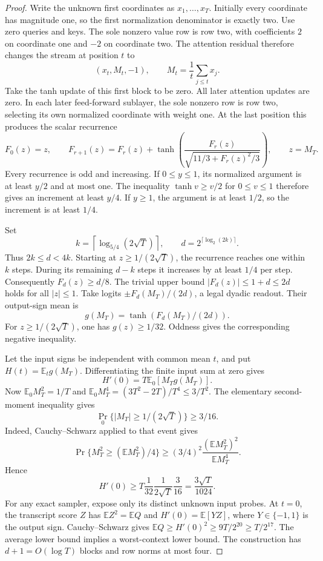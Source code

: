 \begin{proof}
Write the unknown first coordinates as $x_1,\ldots,x_T$. Initially every
coordinate has magnitude one, so the first normalization denominator is
exactly two. Use zero queries and keys. The sole nonzero value row is
row two, with coefficients $2$ on coordinate one and $-2$ on coordinate
two. The attention residual therefore changes the stream at position
$t$ to
\[
 (x_t,M_t,-1),\qquad M_t=\frac1t\sum_{j\le t}x_j.
\]
Take the tanh update of this first block to be zero. All later attention
updates are zero. In each later feed-forward sublayer, the sole nonzero
row is row two, selecting its own normalized coordinate with weight one.
At the last position this produces the scalar recurrence
\[
 F_0(z)=z,\qquad
 F_{r+1}(z)=F_r(z)+
   \tanh\!\left(\frac{F_r(z)}
      {\sqrt{11/3+F_r(z)^2/3}}\right),
 \qquad z=M_T.
\]
Every recurrence is odd and increasing. If $0\le y\le1$, its normalized
argument is at least $y/2$ and at most one. The inequality
$\tanh v\ge v/2$ for $0\le v\le1$ therefore gives an increment at least
$y/4$. If $y\ge1$, the argument is at least $1/2$, so the increment is
at least $1/4$.

Set
\[
 k=\left\lceil\log_{5/4}(2\sqrt T)\right\rceil,
 \qquad d=2^{\lceil\log_2(2k)\rceil}.
\]
Thus $2k\le d<4k$. Starting at $z\ge1/(2\sqrt T)$, the recurrence
reaches one within $k$ steps. During its remaining $d-k$ steps it
increases by at least $1/4$ per step. Consequently
$F_d(z)\ge d/8$. The trivial upper bound $|F_d(z)|\le1+d\le2d$ holds
for all $|z|\le1$. Take logits $\pm F_d(M_T)/(2d)$, a legal dyadic
readout. Their output-sign mean is
\[
 g(M_T)=\tanh(F_d(M_T)/(2d)).
\]
For $z\ge1/(2\sqrt T)$, one has $g(z)\ge1/32$. Oddness gives the
corresponding negative inequality.

Let the input signs be independent with common mean $t$, and put
$H(t)=\mathbb E_tg(M_T)$. Differentiating the finite input sum at zero
gives
\[
 H'(0)=T\mathbb E_0[M_Tg(M_T)].
\]
Now $\mathbb E_0M_T^2=1/T$ and
$\mathbb E_0M_T^4=(3T^2-2T)/T^4\le3/T^2$. The elementary
second-moment inequality gives
\[
 \Pr_0\{|M_T|\ge1/(2\sqrt T)\}\ge3/16.
\]
Indeed, Cauchy--Schwarz applied to that event gives
\[
 \Pr\{M_T^2\ge(\mathbb E M_T^2)/4\}
 \ge(3/4)^2\frac{(\mathbb E M_T^2)^2}{\mathbb E M_T^4}.
\]
Hence
\[
 H'(0)\ge
 T\frac1{32}\frac1{2\sqrt T}\frac3{16}
 =\frac{3\sqrt T}{1024}.
\]
For any exact sampler, expose only its distinct unknown input probes.
At $t=0$, the transcript score $Z$ has
$\mathbb E Z^2=\mathbb E Q$ and $H'(0)=\mathbb E[YZ]$, where
$Y\in\{-1,1\}$ is the output sign. Cauchy--Schwarz gives
$\mathbb E Q\ge H'(0)^2\ge9T/2^{20}\ge T/2^{17}$.
The average lower bound implies a worst-context lower bound. The
construction has $d+1=O(\log T)$ blocks and row norms at most four.
\end{proof}

